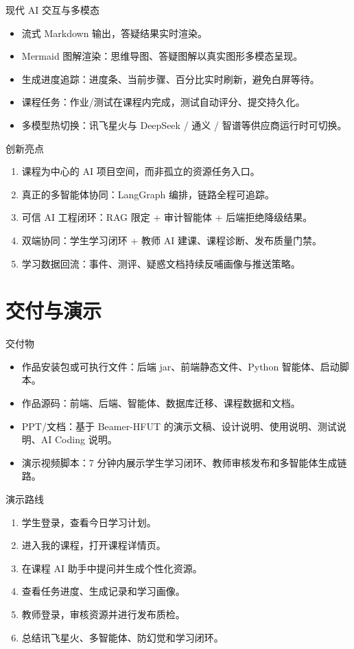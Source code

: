 \documentclass{beamer}
\begin{document}
\begin{frame}{现代 AI 交互与多模态}
\begin{itemize}
  \item 流式 Markdown 输出，答疑结果实时渲染。
  \item Mermaid 图解渲染：思维导图、答疑图解以真实图形多模态呈现。
  \item 生成进度追踪：进度条、当前步骤、百分比实时刷新，避免白屏等待。
  \item 课程任务：作业/测试在课程内完成，测试自动评分、提交持久化。
  \item 多模型热切换：讯飞星火与 DeepSeek / 通义 / 智谱等供应商运行时可切换。
\end{itemize}
\end{frame}

\begin{frame}{创新亮点}
\begin{enumerate}
  \item 课程为中心的 AI 项目空间，而非孤立的资源任务入口。
  \item 真正的多智能体协同：LangGraph 编排，链路全程可追踪。
  \item 可信 AI 工程闭环：RAG 限定 + 审计智能体 + 后端拒绝降级结果。
  \item 双端协同：学生学习闭环 + 教师 AI 建课、课程诊断、发布质量门禁。
  \item 学习数据回流：事件、测评、疑惑文档持续反哺画像与推送策略。
\end{enumerate}
\end{frame}

\section{交付与演示}

\begin{frame}{交付物}
\begin{itemize}
  \item 作品安装包或可执行文件：后端 jar、前端静态文件、Python 智能体、启动脚本。
  \item 作品源码：前端、后端、智能体、数据库迁移、课程数据和文档。
  \item PPT/文档：基于 Beamer-HFUT 的演示文稿、设计说明、使用说明、测试说明、AI Coding 说明。
  \item 演示视频脚本：7 分钟内展示学生学习闭环、教师审核发布和多智能体生成链路。
\end{itemize}
\end{frame}

\begin{frame}{演示路线}
\begin{enumerate}
  \item 学生登录，查看今日学习计划。
  \item 进入我的课程，打开课程详情页。
  \item 在课程 AI 助手中提问并生成个性化资源。
  \item 查看任务进度、生成记录和学习画像。
  \item 教师登录，审核资源并进行发布质检。
  \item 总结讯飞星火、多智能体、防幻觉和学习闭环。
\end{enumerate}
\end{frame}
\end{document}
